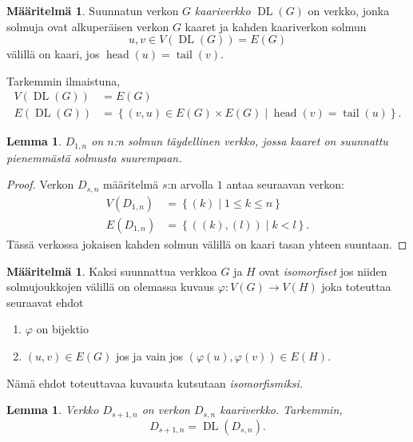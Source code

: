 \documentclass[finnish]{tktltiki2}
\newtheorem{lem}[lau]{Lemma}
\theoremstyle{definition}
\newtheorem{maar}[lau]{Määritelmä}
\theoremstyle{remark}
\newcommand{\set}[1]{\left\{ #1 \right\}}
\newcommand{\from}{\colon}
\DeclareMathOperator{\head}{head}
\DeclareMathOperator{\tail}{tail}
\DeclareMathOperator{\DL}{DL}
\newcommand{\Dsn}{D_{s,n}}
\newcommand{\Dssn}{D_{s+1,n}}
\begin{document}
\begin{maar}
    Suunnatun verkon $G$ \emph{kaariverkko} $\DL(G)$ on verkko, jonka solmuja ovat
    alkuperäisen verkon $G$ kaaret ja kahden kaariverkon solmun
    \begin{equation*}
        u,v \in V(\DL(G)) = E(G)
    \end{equation*}
    välillä on kaari, jos $\head(u) = \tail(v)$.
\end{maar}


Tarkemmin ilmaistuna,
%
\begin{align*}
    V(\DL(G)) &= E(G) \\
    E(\DL(G)) &= \set{(v,u) \in E(G) \times E(G) \mid \head(v) = \tail(u)}.
\end{align*}


\begin{lem}
    $D_{1,n}$ on $n$:n solmun täydellinen verkko, jossa kaaret on suunnattu
    pienemmästä solmusta suurempaan.
\end{lem}

\begin{proof}
    Verkon $\Dsn$ määritelmä $s$:n arvolla $1$ antaa seuraavan verkon:
    \begin{align*}
        V(D_{1,n}) &= \set{(k) \mid 1 \leq k \leq n} \\
        E(D_{1,n}) &= \set{((k), (l)) \mid k < l}.
    \end{align*}
    Tässä verkossa jokaisen kahden solmun välillä on kaari tasan yhteen
    suuntaan.
\end{proof}

\begin{maar}
    Kaksi suunnattua verkkoa $G$ ja $H$ ovat \emph{isomorfiset} jos niiden
    solmujoukkojen välillä on olemassa kuvaus $\varphi \from V(G) \to V(H)$
    joka toteuttaa seuraavat ehdot
    \begin{enumerate}
        \item $\varphi$ on bijektio
        \item $(u,v) \in E(G)$ jos ja vain jos $(\varphi(u), \varphi(v)) \in
            E(H)$.
    \end{enumerate}
    Nämä ehdot toteuttavaa kuvausta kutsutaan \emph{isomorfismiksi}.
\end{maar}

\begin{lem}
    Verkko $\Dssn$ on verkon $\Dsn$ kaariverkko. Tarkemmin,
    \begin{equation*}
        \Dssn = \DL(\Dsn).
    \end{equation*}
\end{lem}
\end{document}

